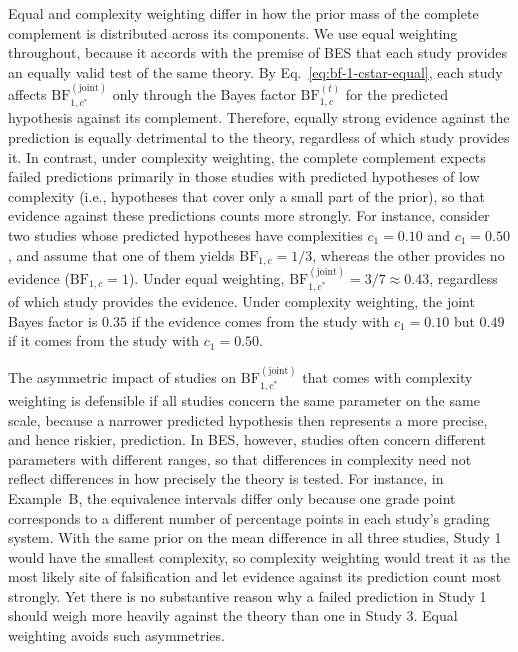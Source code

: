 \documentclass[letterpaper,11pt,oneside]{article}
\begin{document}
Equal and complexity weighting differ in how the prior mass of the complete complement is distributed across its components. We use equal weighting throughout, because it accords with the premise of BES that each study provides an equally valid test of the same theory. By Eq.~\eqref{eq:bf-1-cstar-equal}, each study affects $\mathrm{BF}^{(\text{joint})}_{1,c^*}$ only through the Bayes factor $\mathrm{BF}^{(t)}_{1,c}$ for the predicted hypothesis against its complement. Therefore, equally strong evidence against the prediction is equally detrimental to the theory, regardless of which study provides it. In contrast, under complexity weighting, the complete complement expects failed predictions primarily in those studies with predicted hypotheses of low complexity (i.e., hypotheses that cover only a small part of the prior), so that evidence against these predictions counts more strongly. For instance, consider two studies whose predicted hypotheses have complexities $c_1 = 0.10$ and $c_1 = 0.50$, and assume that one of them yields $\mathrm{BF}_{1,c} = 1/3$, whereas the other provides no evidence ($\mathrm{BF}_{1,c} = 1$). Under equal weighting, $\mathrm{BF}^{(\text{joint})}_{1,c^*} = 3/7 \approx 0.43$, regardless of which study provides the evidence. Under complexity weighting, the joint Bayes factor is $0.35$ if the evidence comes from the study with $c_1 = 0.10$ but $0.49$ if it comes from the study with $c_1 = 0.50$.

The asymmetric impact of studies on $\mathrm{BF}^{(\text{joint})}_{1,c^*}$ that comes with complexity weighting is defensible if all studies concern the same parameter on the same scale, because a narrower predicted hypothesis then represents a more precise, and hence riskier, prediction. In BES, however, studies often concern different parameters with different ranges, so that differences in complexity need not reflect differences in how precisely the theory is tested. For instance, in Example~B, the equivalence intervals differ only because one grade point corresponds to a different number of percentage points in each study's grading system. With the same prior on the mean difference in all three studies, Study 1 would have the smallest complexity, so complexity weighting would treat it as the most likely site of falsification and let evidence against its prediction count most strongly. Yet there is no substantive reason why a failed prediction in Study 1 should weigh more heavily against the theory than one in Study 3. Equal weighting avoids such asymmetries.
\end{document}
